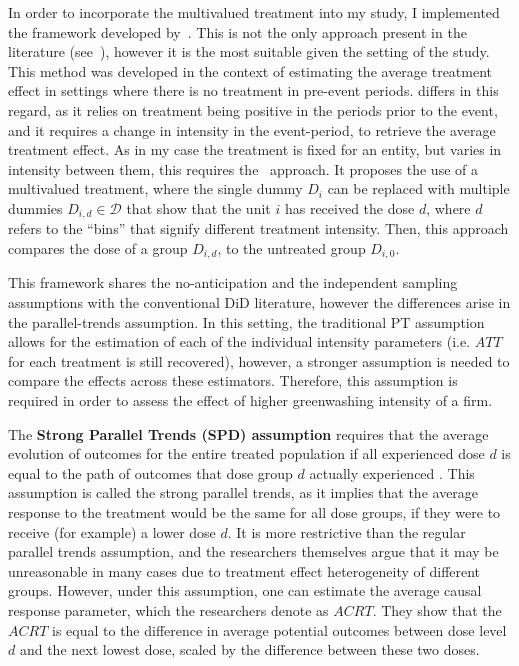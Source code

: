 \documentclass[12pt]{article}
\begin{document}
In order to incorporate the multivalued treatment into my study, I implemented the framework developed by~\textcite{callawayDifferenceinDifferencesContinuousTreatment2025}. This is not the only approach present in the literature (see~\cite{dechaisemartinDifferenceinDifferenceEstimatorsContinuous2024}), however it is the most suitable given the setting of the study. This method was developed in the context of estimating the average treatment effect in settings where there is no treatment in pre-event periods.\@ \citeauthor{dechaisemartinDifferenceinDifferenceEstimatorsContinuous2024} differs in this regard, as it relies on treatment being positive in the periods prior to the event, and it requires a change in intensity in the event-period, to retrieve the average treatment effect. As in my case the treatment is fixed for an entity, but varies in intensity between them, this requires the~\textcite{callawayDifferenceinDifferencesContinuousTreatment2025} approach. It proposes the use of a multivalued treatment, where the single dummy $D_i$ can be replaced with multiple dummies $D_{i,d} \in \mathcal{D}$ that show that the unit $i$ has received the dose $d$, where $d$ refers to the ``bins'' that signify different treatment intensity. Then, this approach compares the dose of a group $D_{i,d}$, to the untreated group $D_{i,0}$.

This framework shares the no-anticipation and the independent sampling assumptions with the conventional DiD literature, however the differences arise in the parallel-trends assumption. In this setting, the traditional PT assumption allows for the estimation of each of the individual intensity parameters (i.e. $ATT$ for each treatment is still recovered), however, a stronger assumption is needed to compare the effects across these estimators. Therefore, this assumption is required in order to assess the effect of higher greenwashing intensity of a firm.  

The \textbf{Strong Parallel Trends (SPD) assumption} requires that the average evolution of  outcomes for the entire treated population if all experienced dose $d$ is equal to the path of outcomes that dose group $d$ actually experienced \parencite{callawayDifferenceinDifferencesContinuousTreatment2025}. This assumption is called the strong parallel trends, as it implies that the average response to the treatment would be the same for all dose groups, if they were to receive (for example) a lower dose $d$. It is more restrictive than the regular parallel trends assumption, and the researchers themselves argue that it may be unreasonable in many cases due to treatment effect heterogeneity of different groups. However, under this assumption, one can estimate the average causal response parameter, which the researchers denote as $ACRT$. They show that the $ACRT$ is equal to the difference in average potential outcomes between dose level $d$ and the next lowest dose, scaled by the difference between these two doses. 
\end{document}
